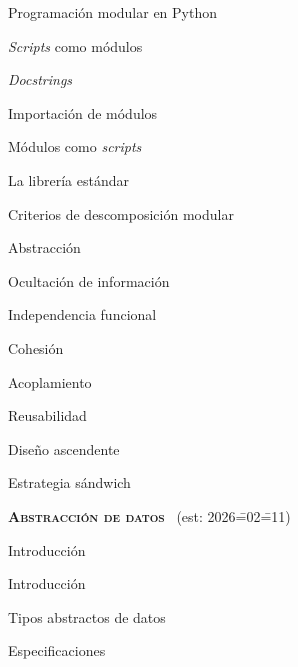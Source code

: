 \begin{longenum}
\begin{longenum}
\begin{longenum}
        \end{longenum}
        \item Programación modular en Python
        \begin{longenum}
            \item \textit{Scripts} como módulos
            \begin{longenum}
                \item \textit{Docstrings}
            \end{longenum}
            \item Importación de módulos
            \item Módulos como \textit{scripts}
            \item La librería estándar
        \end{longenum}
        \item Criterios de descomposición modular
        \begin{longenum}
            \item Abstracción
            \item Ocultación de información
            \item Independencia funcional
            \begin{longenum}
                \item Cohesión
                \item Acoplamiento
            \end{longenum}
            \item Reusabilidad
            \begin{longenum}
                \item Diseño ascendente
                \item Estrategia sándwich
            \end{longenum}
        \end{longenum}
    \end{longenum}
    \item \textbf{\textsc{Abstracción de datos}} \ (est: 2026\==02\==11)
    \begin{longenum}
        \item Introducción
        \begin{longenum}
            \item Introducción
            \item Tipos abstractos de datos
        \end{longenum}
        \item Especificaciones
        \begin{longenum}

\end{longenum}
\end{longenum}
\end{longenum}

